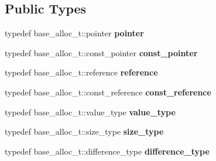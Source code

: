 \subsection*{Public Types}
\begin{DoxyCompactItemize}
\item 
\hypertarget{classlocal__counting__allocator_a2abad2fce804e326b8a571969a7dbe7b}{}typedef base\+\_\+alloc\+\_\+t\+::pointer {\bfseries pointer}\label{classlocal__counting__allocator_a2abad2fce804e326b8a571969a7dbe7b}

\item 
\hypertarget{classlocal__counting__allocator_a2d1d6c7a29b824e2b8e3ff94236611f2}{}typedef base\+\_\+alloc\+\_\+t\+::const\+\_\+pointer {\bfseries const\+\_\+pointer}\label{classlocal__counting__allocator_a2d1d6c7a29b824e2b8e3ff94236611f2}

\item 
\hypertarget{classlocal__counting__allocator_a5c1ff46aee7c63e35e058477140e63bf}{}typedef base\+\_\+alloc\+\_\+t\+::reference {\bfseries reference}\label{classlocal__counting__allocator_a5c1ff46aee7c63e35e058477140e63bf}

\item 
\hypertarget{classlocal__counting__allocator_a90bf27851ec1639484d292f0c505b6cf}{}typedef base\+\_\+alloc\+\_\+t\+::const\+\_\+reference {\bfseries const\+\_\+reference}\label{classlocal__counting__allocator_a90bf27851ec1639484d292f0c505b6cf}

\item 
\hypertarget{classlocal__counting__allocator_a944f16957c36a414b20a8c91327fb520}{}typedef base\+\_\+alloc\+\_\+t\+::value\+\_\+type {\bfseries value\+\_\+type}\label{classlocal__counting__allocator_a944f16957c36a414b20a8c91327fb520}

\item 
\hypertarget{classlocal__counting__allocator_aa6c892c05c91c2eb58a6a57b22b4ab03}{}typedef base\+\_\+alloc\+\_\+t\+::size\+\_\+type {\bfseries size\+\_\+type}\label{classlocal__counting__allocator_aa6c892c05c91c2eb58a6a57b22b4ab03}

\item 
\hypertarget{classlocal__counting__allocator_a281a1843b9abd98fd3951fcaf8edd4ae}{}typedef base\+\_\+alloc\+\_\+t\+::difference\+\_\+type {\bfseries difference\+\_\+type}\label{classlocal__counting__allocator_a281a1843b9abd98fd3951fcaf8edd4ae}

\end{DoxyCompactItemize}
